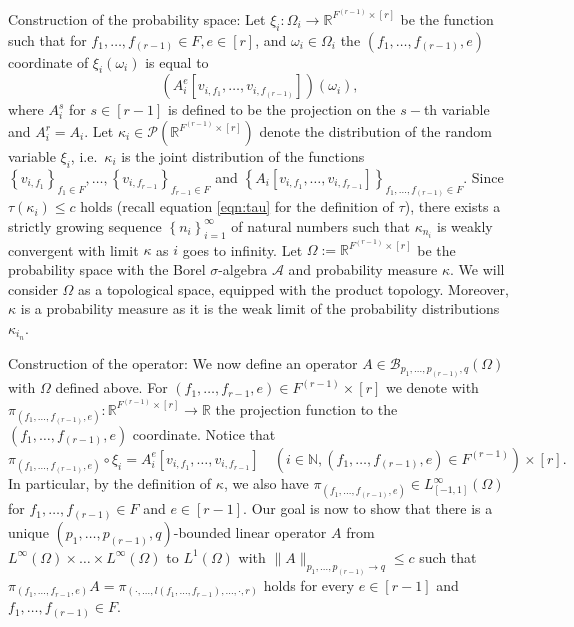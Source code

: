 \documentclass[11pt]{article}
\begin{document}
Construction of the probability space: Let $\xi_{i}: \Omega_{i} \rightarrow \mathbb{R}^{F^{(r-1)} \times[r]}$ be the function such that for $f_1,\ldots,f_{(r-1)} \in F, e \in[r]$, and $\omega_{i} \in \Omega_{i}$ the $(f_1,\ldots,f_{(r-1)}, e)$ coordinate of $\xi_{i}\left(\omega_{i}\right)$ is equal to $$\left(A_{i}^{e}[v_{i, f_1},\ldots, v_{i, f_{(r-1)} }]\right)\left(\omega_{i}\right),$$ where $A_{i}^{s}$ for $s\in [r-1]$ is defined to be the projection on the $s-$th variable and $A_i^r=A_i$. Let $\kappa_{i} \in \mathcal{P}\left(\mathbb{R}^{F^{(r-1)} \times [r]}\right)$ denote the distribution of the random variable $\xi_{i}$, i.e.\ $\kappa_{i}$ is the joint distribution of the functions $\left\{v_{i, f_1}\right\}_{f_{1} \in F},\ldots,\left\{v_{i, f_{r-1}}\right\}_{f_{r-1} \in F}$ and $\left\{A_{i}[v_{i, f_1},\ldots ,v_{i, f_{r-1}} ]\right\}_{f_1,\ldots,f_{(r-1)} \in F}$. Since $\tau\left(\kappa_{i}\right) \leq c$ holds (recall equation \eqref{eqn:tau} for the definition of $\tau$), there exists a strictly growing sequence $\left\{n_{i}\right\}_{i=1}^{\infty}$ of natural numbers such that $\kappa_{n_{i}}$ is weakly convergent with limit $\kappa$ as $i$ goes to infinity. Let $\Omega:=\mathbb{R}^{F^{(r-1)} \times[r]}$ be the probability space with the Borel $\sigma$-algebra $\mathcal{A}$ and probability measure $\kappa$. We will consider $\Omega$ as a topological space, equipped with the product topology. Moreover, $\kappa$ is a probability measure as it is the weak limit of the probability distributions $\kappa_{i_{n}}$.

Construction of the operator: We now define an operator $A \in \mathcal{B}_{p_1,\ldots,p_{(r-1)}, q}(\Omega)$ with $\Omega$ defined above. For $(f_1,\ldots,f_{r-1}, e) \in F^{(r-1)} \times [r]$ we denote with $\pi_{(f_1,\ldots,f_{(r-1)}, e)}: \mathbb{R}^{F^{(r-1)} \times [r]} \rightarrow \mathbb{R}$ the projection function to the $(f_1,\ldots,f_{(r-1)}, e)$ coordinate. Notice that \begin{equation}\label{eqn:EqoperatorLin}
\pi_{(f_1,\ldots,f_{(r-1)}, e)} \circ \xi_{i}= A_{i}^{e}[v_{i, f_1},\ldots ,v_{i, f_{r-1}} ] \quad(i \in \mathbb{N},(f_1,\ldots,f_{(r-1)}, e) \in F^{(r-1)}) \times[r] .\end{equation}
In particular, by the definition of $\kappa$, we also have $\pi_{(f_1,\ldots,f_{(r-1)}, e)} \in L_{[-1,1]}^{\infty}(\Omega)$ for $f_1,\ldots,f_{(r-1)} \in F$ and $e\in [r-1]$. Our goal is now to show that there is a unique $(p_1,\ldots,p_{(r-1)}, q)$-bounded linear operator $A$ from $L^{\infty}(\Omega)\times \ldots \times L^{\infty}(\Omega)$ to $L^{1}(\Omega)$ with $\|A\|_{p_1,\ldots,p_{(r-1)} \rightarrow q} \leq c$ such that $\pi_{(f_1,\ldots, f_{r-1}, e)} A=\pi_{(\cdot,\ldots ,l(f_1,\ldots, f_{r-1}),\ldots,\cdot, r)}$ holds for every $e\in [r-1]$ and $f_1,\ldots, f_{(r-1)} \in F$.
\end{document}
